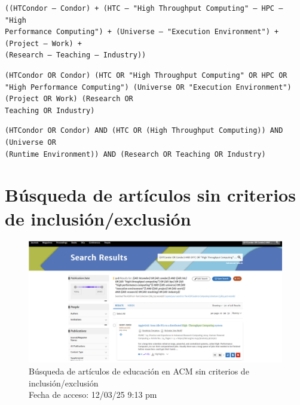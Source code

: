 \begin{tcolorbox}[
		colback=gray!5,
		colframe=black!60,
		title=Cadena de búsqueda en Springer,
		fonttitle=\bfseries,
		sharp corners=south
	]
	\scriptsize
	\begin{verbatim}
((HTCondor — Condor) + (HTC — "High Throughput Computing" — HPC — "High
Performance Computing") + (Universe — "Execution Environment") + (Project — Work) +
(Research — Teaching — Industry))
	\end{verbatim}
\end{tcolorbox}

\begin{tcolorbox}[
		colback=gray!5,
		colframe=black!60,
		title=Cadena de búsqueda en ScienceDirect,
		fonttitle=\bfseries,
		sharp corners=south
	]
	\scriptsize
	\begin{verbatim}
(HTCondor OR Condor) (HTC OR "High Throughput Computing" OR HPC OR "High Performance Computing") (Universe OR "Execution Environment") (Project OR Work) (Research OR
Teaching OR Industry)
	\end{verbatim}
\end{tcolorbox}

\begin{tcolorbox}[
		colback=gray!5,
		colframe=black!60,
		title=Cadena de búsqueda en Taylor \& Francis,
		fonttitle=\bfseries,
		sharp corners=south
	]
	\scriptsize
	\begin{verbatim}
(HTCondor OR Condor) AND (HTC OR (High Throughput Computing)) AND (Universe OR
(Runtime Environment)) AND (Research OR Teaching OR Industry)
  \end{verbatim}
\end{tcolorbox}


\section{Búsqueda de artículos sin criterios de inclusión/exclusión}\label{sec:busqueda-sin-criterios}


\begin{figure}[H]
	\centering
	\includegraphics[width=\textwidth,keepaspectratio]{apendices/bases-datos/sin-exclusion/acm.png}
	\caption{Búsqueda de artículos de educación en ACM sin criterios de inclusión/exclusión \\
		Fecha de acceso: 12/03/25 9:13 pm
	}\label{fig:busqueda-acm-no-exclusion}
\end{figure}


